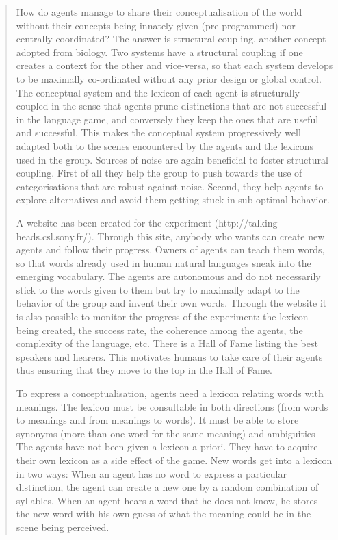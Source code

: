 \begin{quotation}
How do agents manage to share their conceptualisation of the world without their concepts being innately given (pre-programmed) nor centrally coordinated? The answer is structural coupling, another concept adopted from biology. Two systems have a structural coupling if one creates a context for the other and vice-versa, so that each system develops to be maximally co-ordinated without any prior design or global control. The conceptual system and the lexicon of each agent is structurally coupled in the sense that agents prune distinctions that are not successful in the language game, and conversely they keep the ones that are useful and successful. This makes the conceptual system progressively well adapted both to the scenes encountered by the agents and the lexicons used in the group. Sources of noise are again beneficial to foster structural coupling. First of all they help the group to push towards the use of categorisations that are robust against noise. Second, they help agents to explore alternatives and avoid them getting stuck in sub-optimal behavior.

A website has been created for the experiment (http://talking-heads.csl.sony.fr/). Through this site, anybody who wants can create new agents and follow their progress. Owners of agents can teach them words, so that words already used in human natural languages sneak into the emerging vocabulary. The agents are autonomous and do not necessarily stick to the words given to them but try to maximally adapt to the behavior of the group and invent their own words. Through the website it is also possible to monitor the progress of the experiment: the lexicon being created, the success rate, the coherence among the agents, the complexity of the language, etc. There is a Hall of Fame listing the best speakers and hearers. This motivates humans to take care of their agents thus ensuring that they move to the top in the Hall of Fame.

To express a conceptualisation, agents need a lexicon relating words with meanings. The lexicon must be consultable in both directions (from words to meanings and from meanings to words). It must be able to store synonyms (more than one word for the same meaning) and ambiguities The agents have not been given a lexicon a priori. They have to acquire their own lexicon as a side effect of the game. New words get into a lexicon in two ways: When an agent has no word to express a particular distinction, the agent can create a new one by a random combination of syllables. When an agent hears a word that he does not know, he stores the new word with his own guess of what the meaning could be in the scene being perceived.


\end{quotation}
